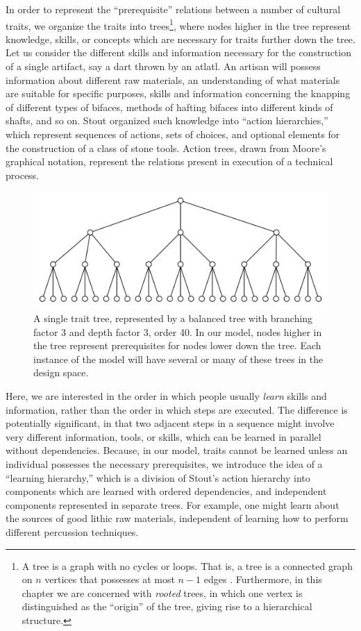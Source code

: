 \documentclass[referee,graybox,natbib]{svmult}
\begin{document}
In order to represent the ``prerequisite'' relations between a number of
cultural traits, we organize the traits into trees\footnote{A tree is a
  graph with no cycles or loops. That is, a tree is a connected graph on
  $n$ vertices that possesses at most $n-1$ edges
  \citep{diestel2010graph}. Furthermore, in this chapter we are
  concerned with \emph{rooted} trees, in which one vertex is
  distinguished as the ``origin'' of the tree, giving rise to a
  hierarchical structure.}, where nodes higher in the tree represent
knowledge, skills, or concepts which are necessary for traits further
down the tree. Let us consider the different skills and information
necessary for the construction of a single artifact, say a dart thrown
by an atlatl. An artisan will possess information about different raw
materials, an understanding of what materials are suitable for specific
purposes, skills and information concerning the knapping of different
types of bifaces, methods of hafting bifaces into different kinds of
shafts, and so on. Stout \citeyearpar{stout2011stone} organized such
knowledge into ``action hierarchies,'' which represent sequences of
actions, sets of choices, and optional elements for the construction of
a class of stone tools. Action trees, drawn from Moore's
\citeyearpar{moore2010grammars} graphical notation, represent the
relations present in execution of a technical process.

\begin{figure}[h] 
\centering 
\includegraphics[]{balanced-trait-tree-3-3.png} 
\caption{A single trait tree, represented by a balanced tree with branching factor 3 and depth factor 3, order 40.  In our model, nodes higher in the tree represent prerequisites for nodes lower down the tree.  Each instance of the model will have several or many of these trees in the design space.} 
\label{img:trait-tree} 
\end{figure}

Here, we are interested in the order in which people usually
\emph{learn} skills and information, rather than the order in which
steps are executed. The difference is potentially significant, in that
two adjacent steps in a sequence might involve very different
information, tools, or skills, which can be learned in parallel without
dependencies. Because, in our model, traits cannot be learned unless an
individual possesses the necessary prerequisites, we introduce the idea
of a ``learning hierarchy,'' which is a division of Stout's action
hierarchy into components which are learned with ordered dependencies,
and independent components represented in separate trees. For example,
one might learn about the sources of good lithic raw materials,
independent of learning how to perform different percussion techniques.
\end{document}
